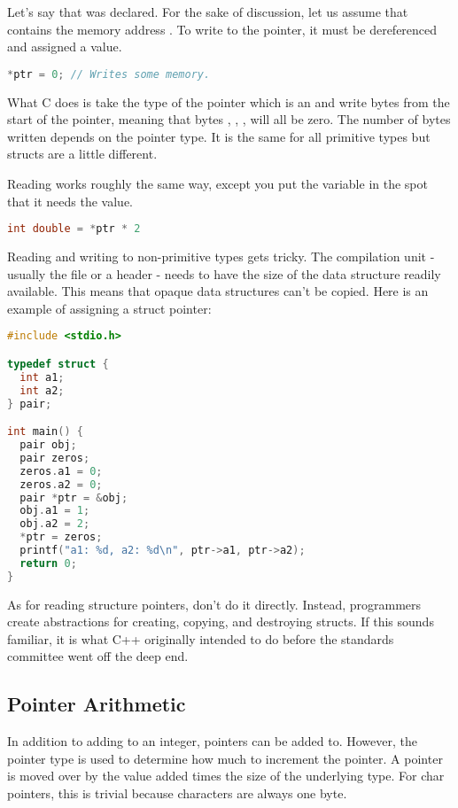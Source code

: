 Let's say that  was declared.
For the sake of discussion, let us assume that  contains the memory address .
To write to the pointer, it must be dereferenced and assigned a value.

\begin{lstlisting}[language=C]
*ptr = 0; // Writes some memory.
\end{lstlisting}

What C does is take the type of the pointer which is an  and write  bytes from the start of the pointer, meaning that bytes , , ,  will all be zero.
The number of bytes written depends on the pointer type.
It is the same for all primitive types but structs are a little different.

Reading works roughly the same way, except you put the variable in the spot that it needs the value.

\begin{lstlisting}[language=C]
int double = *ptr * 2
\end{lstlisting}

Reading and writing to non-primitive types gets tricky.
The compilation unit - usually the file or a header - needs to have the size of the data structure readily available.
This means that opaque data structures can't be copied.
Here is an example of assigning a struct pointer:

\begin{lstlisting}[language=C]
#include <stdio.h>

typedef struct {
  int a1;
  int a2;
} pair;

int main() {
  pair obj;
  pair zeros;
  zeros.a1 = 0;
  zeros.a2 = 0;
  pair *ptr = &obj;
  obj.a1 = 1;
  obj.a2 = 2;
  *ptr = zeros;
  printf("a1: %d, a2: %d\n", ptr->a1, ptr->a2);
  return 0;
}
\end{lstlisting}

As for reading structure pointers, don't do it directly.
Instead, programmers create abstractions for creating, copying, and destroying structs.
If this sounds familiar, it is what C++ originally intended to do before the standards committee went off the deep end.

\subsection{Pointer Arithmetic}

In addition to adding to an integer, pointers can be added to.
However, the pointer type is used to determine how much to increment the pointer.
A pointer is moved over by the value added times the size of the underlying type.
For char pointers, this is trivial because characters are always one byte.

